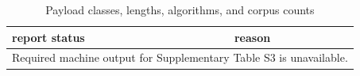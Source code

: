 \begin{table}[htbp]
\centering
\caption{Payload classes, lengths, algorithms, and corpus counts}
\label{tab:s3}
\begin{tabular}{ll}
\hline
report status & reason \\
\hline
\multicolumn{2}{l}{Required machine output for Supplementary Table S3 is unavailable.} \\
\hline
\end{tabular}
\end{table}
